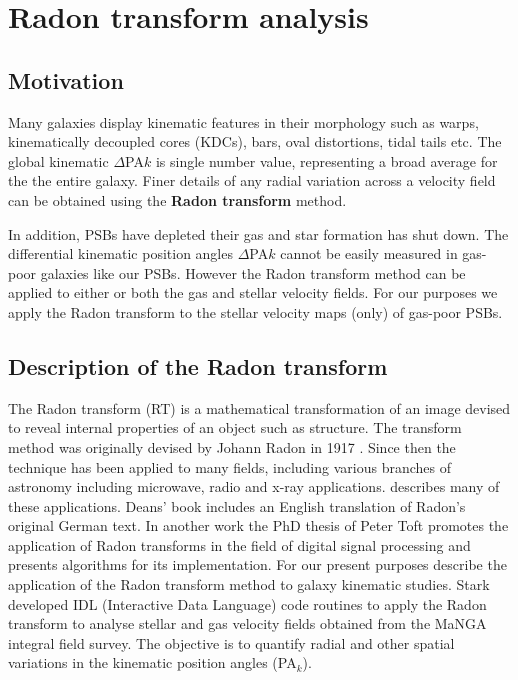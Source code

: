 \section{Radon transform analysis}
\label{sec:methods-II-Radon}

\subsection{Motivation}
\label{sec:motivation}

Many galaxies display kinematic features in their morphology such as warps, kinematically decoupled cores (KDCs), bars, oval distortions, tidal tails etc. The global kinematic $\Delta$PA${k}$ is single number value, representing a broad average for the the entire galaxy. Finer details of any radial variation across a velocity field can be obtained using the \textbf{Radon transform} method.

In addition, PSBs have depleted their gas and star formation has shut down. The differential kinematic position angles $\Delta$PA${k}$ cannot be easily measured in gas-poor galaxies like our PSBs. However the Radon transform method can be applied to either or both the gas and stellar velocity fields. For our purposes we apply the Radon transform to the stellar velocity maps (only) of gas-poor PSBs. 


\subsection{Description of the Radon transform}

The Radon transform (RT) is a mathematical transformation of an image devised to reveal internal properties of an object such as structure. The transform method was originally devised by Johann Radon in 1917 \citep{radon1917determination}. Since then the technique has been applied to many fields, including various branches of astronomy including microwave, radio and x-ray applications. \citet{deans2007radon} describes many of these applications. Deans' book includes an English translation of Radon's original German text. In another work the PhD thesis of  Peter Toft \citet{7910dc8d5b654c90ac4bc94c67d06f01} promotes the application of Radon transforms in the field of digital signal processing and presents algorithms for its implementation. For our present purposes \cite{2018MNRAS.480.2217S} describe the application of the Radon transform method to galaxy kinematic studies. Stark developed IDL (Interactive Data Language) code routines to apply the Radon transform to analyse stellar and gas velocity fields obtained from the MaNGA integral field survey. The objective is to quantify radial and other spatial variations in the kinematic position angles (PA$_{k}$).


